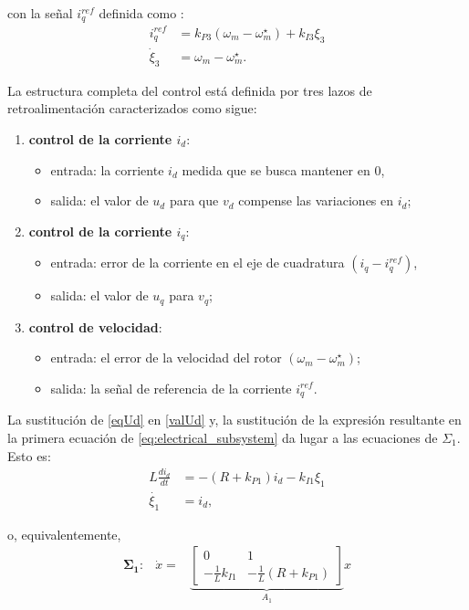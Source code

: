 con la señal $i_q^{ref}$ definida como :
\begin{equation}\label{xi}
\begin{aligned}
i_{q}^{ref} &= k_{P3}(\omega_m - \omega_m^\star) + k_{I3}\xi_3 \\
\dot{\xi}_3 &= \omega_m - \omega_m^\star.
\end{aligned}
\end{equation}

La estructura completa del control está definida por tres lazos de retroalimentación caracterizados
como sigue:

\begin{enumerate}
    \item \textbf{control de la corriente $i_d$}: \begin{itemize}
        \item entrada: la corriente $i_d$ medida que se busca mantener en 0,
        \item salida: el valor de $u_d$ para que $v_d$ compense las variaciones en $i_d$;
    \end{itemize}
    \item \textbf{control de la corriente $i_q$}: \begin{itemize}
        \item entrada: error de la corriente en el eje de cuadratura $(i_q - i_q^{ref})$,
        \item salida: el valor de $u_q$ para $v_q$;
    \end{itemize}
    \item \textbf{control de velocidad}: \begin{itemize}
        \item entrada: el error de la velocidad del rotor $(\omega_m - \omega_m^\star)$;
        \item salida: la señal de referencia de la corriente $i_q^{ref}$.
    \end{itemize}
\end{enumerate}

La sustitución de \eqref{eqUd} en \eqref{valUd} y, la sustitución de la expresión resultante en la primera
ecuación de \eqref{eq:electrical_subsystem} da lugar a las ecuaciones de $\Sigma_1$. Esto es:
\begin{align}
    L\frac{di_d}{dt} &= -(R+k_{P1})i_d - k_{I1}\xi_1\\
    \dot{\xi_1} &= i_d,
\end{align}

o, equivalentemente, %
\begin{align}\label{eq:sigma_1}
    \mathbf{\Sigma_1:}\;\;\: \dot x= & \underbrace{\begin{bmatrix}0&1\\  -\frac{1}{L}k_{I1} & -\frac{1}{L}(R+k_{P1}) 
    \end{bmatrix}}_{A_1}x
 \end{align}

